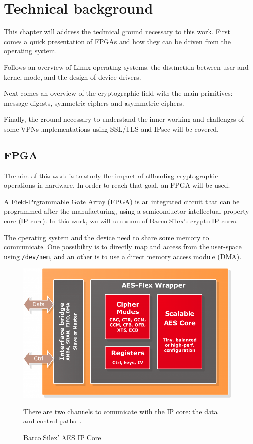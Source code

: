 \chapter{Technical background}\label{chap:theory}

This chapter will address the technical ground necessary to this work.
First comes a quick presentation of FPGAs and how they can be driven from the operating system.

\noindent Follows an overview of Linux operating systems, the distinction between user and kernel mode, and the design of device drivers.

\noindent Next comes an overview of the cryptographic field with the main primitives: message digests, symmetric ciphers and asymmetric ciphers.

\noindent Finally, the ground necessary to understand the inner working and challenges of some VPNs implementations using SSL/TLS and IPsec will be covered.



\section{FPGA}
The aim of this work is to study the impact of offloading cryptographic operations in hardware.
In order to reach that goal, an FPGA will be used.

A Field-Prgrammable Gate Array (FPGA) is an integrated circuit that can be programmed after the manufacturing, using a semiconductor intellectual property core (IP core).
In this work, we will use some of Barco Silex's crypto IP cores.

The operating system and the device need to share some memory to communicate.
One possibility is to directly map and access from the user-space using \texttt{/dev/mem}, and an other is to use a direct memory access module (DMA).

\begin{figure}
\includegraphics[width=\linewidth]{barco-ba411e-ipcore}
\caption{Barco Silex' AES IP Core}{There are two channels to comunicate with the IP core: the data and control paths~\cite{barco-ba411e}.}
\label{fig:barco-ba411e-ipcore}
\end{figure}

